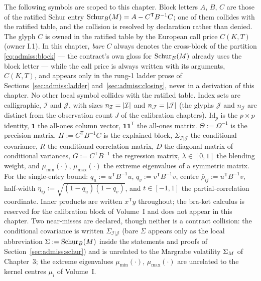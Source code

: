 The following symbols are scoped to this chapter. Block letters $A$, $B$,
$C$ are those of the ratified Schur entry
$\mathrm{Schur}_{B}\!\left(M\right) = A - C^{\mathsf T} B^{-1} C$; one of them collides with the
ratified table, and the collision is resolved by declaration rather than
denied. The glyph $C$ is owned in the ratified table by the European call
price $C(K,T)$ (owner I.1). In this chapter, \emph{bare} $C$ always denotes
the cross-block of the partition \eqref{eq:admiss:block} --- the contract's
own gloss for $\mathrm{Schur}_{B}\!\left(M\right)$ already uses the block letter --- while the
call price is always written with its arguments, $C(K,T)$, and appears only
in the rung-1 ladder prose of Sections~\ref{sec:admiss:ladder}
and~\ref{sec:admiss:closing}, never in a derivation of this chapter. No
other local symbol collides with the ratified table. Index sets are
calligraphic, $\mathcal{I}$ and $\mathcal{J}$, with sizes
$n_{\mathcal I} = \lvert\mathcal I\rvert$ and $n_{\mathcal J} = \lvert\mathcal J\rvert$
(the glyphs $\mathcal J$ and $n_{\mathcal J}$ are distinct from the
observation count $J$ of the calibration chapters). $\mathrm{Id}_p$ is the
$p \times p$ identity, $\mathbf{1}$ the all-ones column vector,
$\mathbf{1}\mathbf{1}^{\mathsf T}$ the all-ones matrix. $\Theta :=
\Omega^{-1}$ is the precision matrix. $\Pi := C^{\mathsf T} B^{-1} C$ is the
explained block, $\Sigma_{\mathcal I | \mathcal J}$ the conditional
covariance, $R$ the conditional correlation matrix, $D$ the diagonal matrix
of conditional variances, $G := C^{\mathsf T} B^{-1}$ the regression matrix,
$\lambda \in [0,1]$ the blending weight, and $\mu_{\min}(\cdot)$,
$\mu_{\max}(\cdot)$ the extreme eigenvalues of a symmetric matrix. For the
single-entry bound: $q_u := u^{\mathsf T} B^{-1} u$,
$q_v := v^{\mathsf T} B^{-1} v$, centre $\bar\rho_{ij} :=
u^{\mathsf T} B^{-1} v$, half-width $\eta_{ij} :=
\sqrt{(1-q_u)(1-q_v)}$, and $t \in [-1,1]$ the partial-correlation
coordinate. Inner products are written $x^{\mathsf T} y$ throughout; the
bra-ket calculus is reserved for the calibration block of Volume~I and does
not appear in this chapter. Two near-misses are declared,
though neither is a contract collision: the conditional
covariance is written $\Sigma_{\mathcal I|\mathcal J}$ (bare $\Sigma$
appears only as the local abbreviation $\Sigma := \mathrm{Schur}_{B}\!\left(M\right)$ inside the
statements and proofs of Section~\ref{sec:admiss:schur}) and is unrelated
to the Margrabe volatility $\Sigma_M$ of Chapter~3; the extreme eigenvalues
$\mu_{\min}(\cdot)$, $\mu_{\max}(\cdot)$ are unrelated to the kernel
centres $\mu_i$ of Volume~I.

